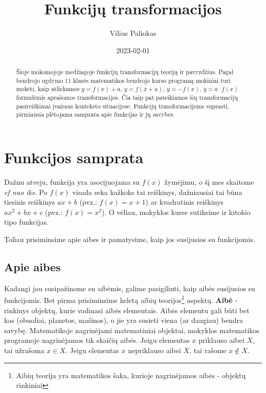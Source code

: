 \documentclass{tufte-handout}
\title{Funkcijų transformacijos}
\author[Vilius Paliokas]{Vilius Paliokas}
\date{2023-02-01} %
\begin{document}
\maketitle%

\begin{abstract}
  \noindent
  Šioje mokomojoje medžiagoje funkcijų transformacijų teoriją ir pavyzdžius.
  Pagal bendrojo ugdymo 11 klasės matematikos bendrojo kurso programą mokiniai
  turi mokėti, kaip atliekamos $y=f(x)+a$, $y=f(x+a)$, $y=-f(x)$, $y=a\cdot
    f(x)$
  formulėmis aprašomos transformacijos. Čia taip pat pateikiamos šių
  transformacijų pasireiškimai įvairaus konteksto situacijose. Funkcijų
  transformacijoms suprasti, pirmiausia plėtojama samprata apie funkcijas ir jų
  savybes.
\end{abstract}

\section{Funkcijos samprata}\label{se c:page-layout}

Dažnu atveju, funkcija yra asocijuojama su $f(x)$ žymėjimu, o šį mes skaitome
\textit{ef nuo iks}. Po $f(x)$ visada seka kažkoks tai
reiškinys, dažniausiai tai būna tiesinis reiškinys $ax+b$ (pvz.:
$f(x)=x+1$) ar
kvadratinis reiškinys $ax^2+bx+c$ (pvz.: $f(x)=x^2$). O vėliau, mokyklos kurse
sutiksime ir kitokio
tipo funkcijas.

Toliau prisiminsime apie aibes ir pamatysime, kaip jos susijusios su
funkcijomis.

\subsection{Apie aibes}\label{sec:about_sets}

Kadangi jau susipažinome su aibėmis, galime pasigilinti, kaip aibės
susijusios su funkcijomis. Bet pirma prisiminsime keletą aibių
teorijos\footnote{Aibių teorija yra matematikos šaka, kurioje nagrinėjamos
  aibės - objektų rinkiniai} aspektų. \textbf{Aibė} - rinkinys	objektų, kurie
vadinasi aibės elementais. Aibės elementu gali būti bet kas (obuoliai,
planetos, mašinos), o jie yra susieti viena (ar daugiau) bendra
savybę. Matematikoje nagrinėjami matematiniai objektai, mokyklos matematikos
programoje nagrinėjamos
tik skaičių aibės. Jeigu elementas $x$ priklauso aibei $X$, tai užrašoma $x \in
  X$. Jeigu elementas $x$ nepriklauso aibei $X$, tai rašome $x \notin X$.
\end{document}
